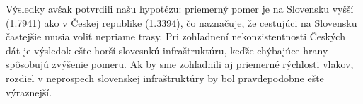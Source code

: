 \documentclass[main.tex]{subfiles}
\begin{document}
Výsledky avšak potvrdili našu hypotézu: priemerný pomer je na Slovensku vyšší (1.7941) ako v Českej republike (1.3394), čo naznačuje, že cestujúci na Slovensku častejšie musia voliť nepriame trasy. Pri zohľadnení nekonzistentnosti Českých dát je výsledok ešte horší slovesnkú infraštruktúru, keďže chýbajúce hrany spôsobujú zvýšenie pomeru. Ak by sme zohľadnili aj priemerné rýchlosti vlakov, rozdiel v neprospech slovenskej infraštruktúry by bol pravdepodobne ešte výraznejší.
\end{document}
